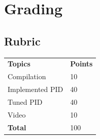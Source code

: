 \documentclass[letta4 paper]{article}
\numberwithin{equation}{section}
\newcommand{\0}{\mathbf{0}}
\begin{document}
	\section{Grading}

	\subsection{Rubric}
	\begin{table}[h]
		\begin{tabular}{ll}
			\textbf{Topics} & \textbf{Points} \\
			Compilation & 10 \\
			Implemented PID & 40 \\
			Tuned PID & 40 \\
			Video & 10 \\
			\textbf{Total} & 100 \\
		\end{tabular}
	\end{table}
	

	
			
\end{document}
